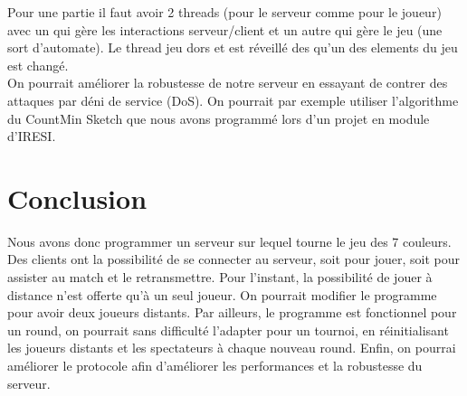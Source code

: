 \documentclass[a4paper]{article}
\begin{document}
Pour une partie il faut avoir 2 threads (pour le serveur comme pour le joueur) 
avec un qui gère les interactions serveur/client et un autre qui gère le jeu 
(une sort d'automate). Le thread jeu dors et est réveillé des qu'un des 
elements du jeu est changé. \\


On pourrait améliorer la robustesse de notre serveur en essayant de contrer des attaques par déni de service (DoS). On pourrait par exemple utiliser l'algorithme du CountMin Sketch que nous avons programmé lors d'un projet en module d'IRESI. \\


\section*{Conclusion}

Nous avons donc programmer un serveur sur lequel tourne le jeu des 7 couleurs. Des clients ont la possibilité de se connecter au serveur, soit pour jouer, soit pour assister au match et le retransmettre. Pour l'instant, la possibilité de jouer à distance n'est offerte qu'à un seul joueur. On pourrait modifier le programme pour avoir deux joueurs distants. Par ailleurs, le programme est fonctionnel pour un round, on pourrait sans difficulté l'adapter pour un tournoi, en réinitialisant les joueurs distants et les spectateurs à chaque nouveau round. Enfin, on pourrai améliorer le protocole afin d'améliorer les performances et la robustesse du serveur.


 

\end{document}
